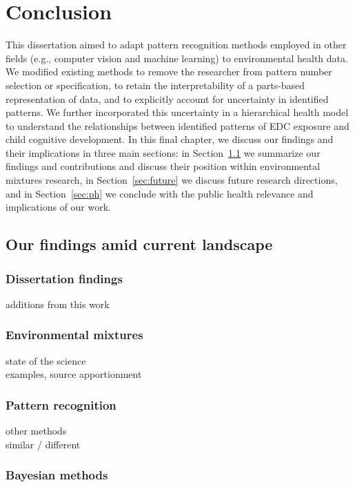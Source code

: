 \chapter{Conclusion}\label{sec:conclusion}
\clearpage

This dissertation aimed to adapt pattern recognition methods employed in other fields (e.g., computer vision and machine learning) to environmental health data. We modified existing methods to remove the researcher from pattern number selection or specification, to retain the interpretability of a parts-based representation of data, and to explicitly account for uncertainty in identified patterns. We further incorporated this uncertainty in a hierarchical health model to understand the relationships between identified patterns of EDC exposure and child cognitive development. In this final chapter, we discuss our findings and their implications in three main sections: in Section~\ref{sec:summarize} we summarize our findings and contributions and discuss their position within environmental mixtures research, in Section~\ref{sec:future} we discuss future research directions, and in Section~\ref{sec:ph} we conclude with the public health relevance and implications of our work.

\section{Our findings amid current landscape}\label{sec:summarize}

\subsection{Dissertation findings}\label{sec:findings}
additions from this work

\subsection{Environmental mixtures}\label{sec:mixtures}
state of the science \\
examples, source apportionment

\subsection{Pattern recognition}\label{sec:patrec}
other methods \\
similar / different \\

\subsection{Bayesian methods}\label{sec:bayes}



